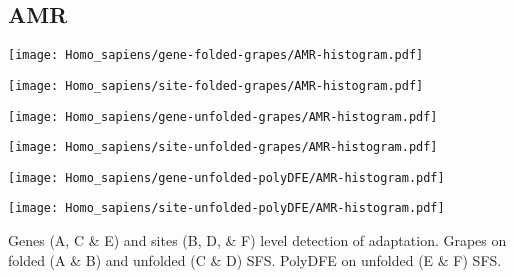 \documentclass{article}
\begin{document}
\subsection{AMR}
\centering
\begin{minipage}{0.49\linewidth}
    \texttt{[image: Homo\_sapiens/gene-folded-grapes/AMR-histogram.pdf]}
\end{minipage}%
\hfill
\begin{minipage}{0.49\linewidth}
    \texttt{[image: Homo\_sapiens/site-folded-grapes/AMR-histogram.pdf]}
\end{minipage}
\hfill
\begin{minipage}{0.49\linewidth}
    \texttt{[image: Homo\_sapiens/gene-unfolded-grapes/AMR-histogram.pdf]}
\end{minipage}%
\hfill
\begin{minipage}{0.49\linewidth}
    \texttt{[image: Homo\_sapiens/site-unfolded-grapes/AMR-histogram.pdf]}
\end{minipage}
\hfill
\begin{minipage}{0.49\linewidth}
    \texttt{[image: Homo\_sapiens/gene-unfolded-polyDFE/AMR-histogram.pdf]}
\end{minipage}%
\hfill
\begin{minipage}{0.49\linewidth}
    \texttt{[image: Homo\_sapiens/site-unfolded-polyDFE/AMR-histogram.pdf]}
\end{minipage}
\hfill
\flushleft
Genes (A, C \& E) and sites (B, D, \& F) level detection of adaptation.
Grapes on folded (A \& B) and unfolded (C \& D) SFS.
PolyDFE on unfolded (E \& F) SFS.

\pagebreak
\end{document}
